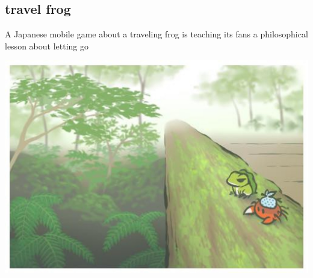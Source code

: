 \subsection{travel frog}
A Japanese mobile game about a traveling frog is teaching its fans a philosophical lesson about letting go

\includegraphics[width=.5\textwidth]{frog/image/voyagefrog.jpg}

